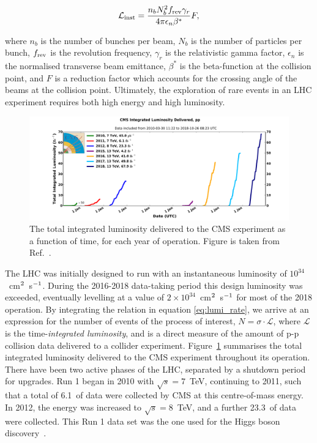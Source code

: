 \begin{equation}\label{eq:inst_lumi}
    \mathcal{L}_{\rm{inst}} = \frac{n_bN_b^2f_{\rm{rev}}\gamma_r}{4\pi\epsilon_n\beta^*}F,
\end{equation}

\noindent
where $n_b$ is the number of bunches per beam, $N_b$ is the number of particles per bunch, $f_{\rm{rev}}$ is the revolution frequency, $\gamma_r$ is the relativistic gamma factor, $\epsilon_n$ is the normalised transverse beam emittance, $\beta^*$ is the beta-function at the collision point, and $F$ is a reduction factor which accounts for the crossing angle of the beams at the collision point. Ultimately, the exploration of rare events in an LHC experiment requires both high energy and high luminosity.

\begin{figure}
  \centering
  \includegraphics[width=1\textwidth]{Figures/cms/luminosity.pdf}
  \caption[The total integrated luminosity delivered to the CMS experiment]
  {
    The total integrated luminosity delivered to the CMS experiment as a function of time, for each year of operation.
    Figure is taken from Ref.~\cite{CMSLumiPublic}.
  }
  \label{fig:luminosity}
\end{figure}

The LHC was initially designed to run with an instantaneous luminosity of $10^{34}$~cm$^{\rm{2}}$~s$^{\rm{-1}}$. During the 2016-2018 data-taking period this design luminosity was exceeded, eventually levelling at a value of $2 \times 10^{34}$~cm$^{\rm{2}}$~s$^{\rm{-1}}$ for most of the 2018 operation. By integrating the relation in equation \ref{eq:lumi_rate}, we arrive at an expression for the number of events of the process of interest, $N=\sigma\cdot\mathcal{L}$, where $\mathcal{L}$ is the time-\textit{integrated luminosity}, and is a direct measure of the amount of p-p collision data delivered to a collider experiment. Figure~\ref{fig:luminosity} summarises the total integrated luminosity delivered to the CMS experiment throughout its operation. There have been two active phases of the LHC, separated by a shutdown period for upgrades. Run 1 began in 2010 with $\sqrt{s}=7$~TeV, continuing to 2011, such that a total of 6.1~\fbinv of data were collected by CMS at this centre-of-mass energy. In 2012, the energy was increased to $\sqrt{s}=8$~TeV, and a further 23.3~\fbinv of data were collected. This Run 1 data set was the one used for the Higgs boson discovery~\cite{Aad:2012tfa,Chatrchyan:2012xdj,Chatrchyan:2013lba}. 

